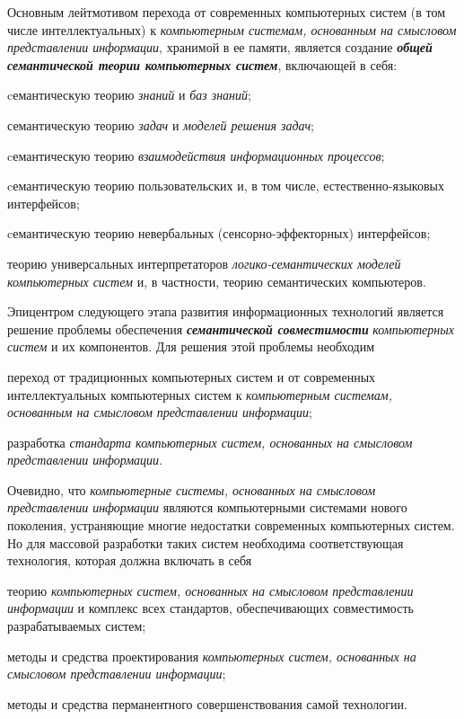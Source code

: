 \begin{SCn}
\begin{scnsubstruct}
{			Основным лейтмотивом перехода от современных компьютерных систем (в том числе интеллектуальных) к
			\textit{компьютерным системам, основанным на смысловом представлении
				информации}, хранимой в ее памяти, является создание \textbf{\textit{общей
					семантической теории компьютерных систем}}, включающей в себя:
			\begin{scnitemize}
				\item cемантическую теорию \textit{знаний} и \textit{баз знаний};
				\item семантическую теорию \textit{задач} и \textit{моделей решения
					задач};
				\item cемантическую теорию \textit{взаимодействия информационных
					процессов};
				\item cемантическую теорию пользовательских и, в том числе,
				естественно-языковых интерфейсов;
				\item cемантическую теорию невербальных (сенсорно-эффекторных)
				интерфейсов;
				\item теорию универсальных интерпретаторов \textit{логико-семантических
					моделей компьютерных систем} и, в частности, теорию семантических компьютеров.
			\end{scnitemize}
			Эпицентром следующего этапа развития информационных технологий является
			решение проблемы обеспечения \textbf{\textit{семантической совместимости}}
			\textit{компьютерных систем} и их компонентов. Для решения этой проблемы
			необходим
			\begin{scnitemize}
				\item переход от традиционных компьютерных систем и от современных
				интеллектуальных компьютерных систем к \textit{компьютерным системам,
					основанным на смысловом представлении информации};
				\item разработка \textit{стандарта компьютерных систем, основанных на
					смысловом представлении информации}.
			\end{scnitemize}
			Очевидно, что \textit{компьютерные системы, основанных на смысловом
				представлении информации} являются компьютерными системами нового поколения,
			устраняющие многие недостатки современных компьютерных систем. Но для массовой
			разработки таких систем необходима соответствующая технология, которая должна
			включать в себя
			\begin{scnitemize}
				\item теорию \textit{компьютерных систем, основанных на смысловом
					представлении информации} и комплекс всех стандартов, обеспечивающих
				совместимость разрабатываемых систем;
				\item методы и средства проектирования \textit{компьютерных систем,
					основанных на смысловом представлении информации};
				\item методы и средства перманентного совершенствования самой
				технологии.
			\end{scnitemize}}

		\bigskip
	\end{scnsubstruct}
\end{SCn}
